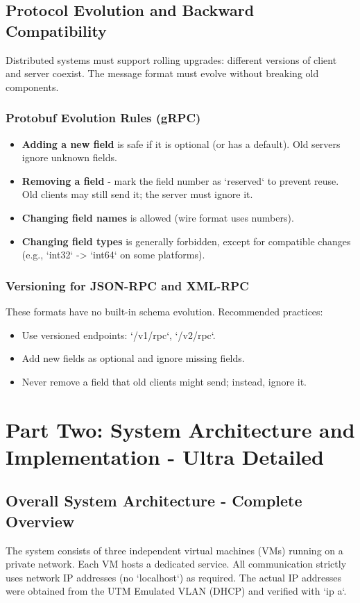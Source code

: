 \documentclass[a4paper]{article}
\begin{document}
\subsection{Protocol Evolution and Backward Compatibility}
Distributed systems must support rolling upgrades: different versions of client and server coexist. The message format must evolve without breaking old components.

\subsubsection{Protobuf Evolution Rules (gRPC)}
\begin{itemize}
    \item \textbf{Adding a new field} is safe if it is optional (or has a default). Old servers ignore unknown fields.
    \item \textbf{Removing a field} - mark the field number as `reserved` to prevent reuse. Old clients may still send it; the server must ignore it.
    \item \textbf{Changing field names} is allowed (wire format uses numbers).
    \item \textbf{Changing field types} is generally forbidden, except for compatible changes (e.g., `int32` -> `int64` on some platforms).
\end{itemize}

\subsubsection{Versioning for JSON-RPC and XML-RPC}
These formats have no built-in schema evolution. Recommended practices:
\begin{itemize}
    \item Use versioned endpoints: `/v1/rpc`, `/v2/rpc`.
    \item Add new fields as optional and ignore missing fields.
    \item Never remove a field that old clients might send; instead, ignore it.
\end{itemize}

\section{Part Two: System Architecture and Implementation - Ultra Detailed}

\subsection{Overall System Architecture - Complete Overview}
The system consists of three independent virtual machines (VMs) running on a private network. Each VM hosts a dedicated service. All communication strictly uses network IP addresses (no `localhost`) as required. The actual IP addresses were obtained from the UTM Emulated VLAN (DHCP) and verified with `ip a`.
\end{document}
